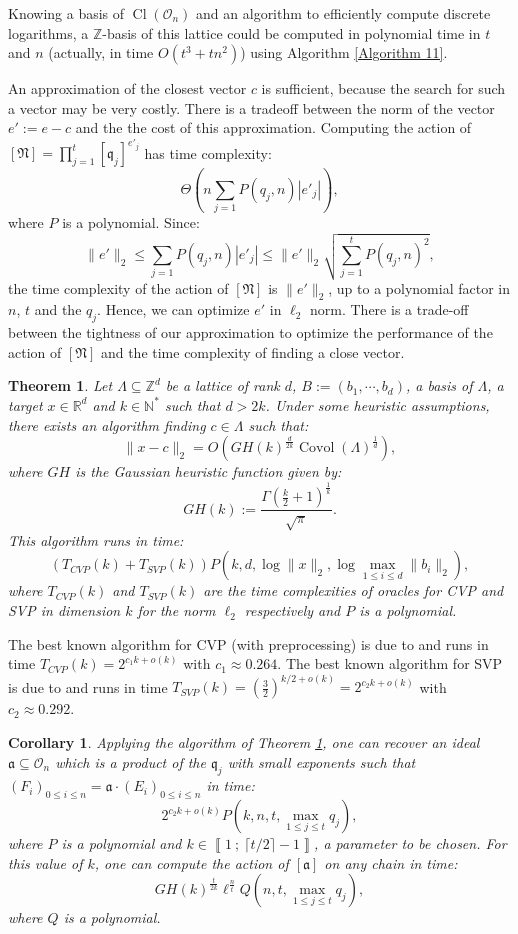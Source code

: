 \documentclass[a4paper,10pt,notitlepage]{report}
\theoremstyle{definition}
\theoremstyle{plain}
\newtheorem{Corollary}[Definition]{Corollary}
\newtheorem{Theorem}[Definition]{Theorem}
\theoremstyle{definition}
\newcommand{\N}{\mathbb{N}}
\newcommand{\Z}{\mathbb{Z}}
\newcommand{\R}{\mathbb{R}}
\newcommand{\mO}{\mathcal{O}}
\renewcommand{\i}[2]{\left\llbracket #1~;~#2\right\rrbracket}
\renewcommand{\(}{\left(}
\renewcommand{\)}{\right)}
\newcommand{\mf}[1]{\mathfrak{#1}}
\DeclareMathOperator{\Cl}{Cl}
\DeclareMathOperator{\Covol}{Covol}
\begin{document}
Knowing a basis of $\Cl(\mO_n)$ and an algorithm to efficiently compute discrete logarithms, a $\Z$-basis of this lattice could be computed in polynomial time in $t$ and $n$ (actually, in time $O(t^3+tn^2)$) using Algorithm \ref{Algorithm 11}.

An approximation of the closest vector $c$ is sufficient, because the search for such a vector may be very costly. There is a tradeoff between the norm of the vector $e':=e-c$ and the the cost of this approximation. Computing the action of $[\mf{N}]=\prod_{j=1}^t[\mf{q}_j]^{e'_j}$ has time complexity:
\[\Theta\(n\sum_{j=1}P(q_j,n)|e'_j|\),\]
where $P$ is a polynomial. Since:
\[\|e'\|_2\leq \sum_{j=1}P(q_j,n)|e'_j|\leq \|e'\|_2\sqrt{\sum_{j=1}^tP(q_j,n)^2},\]
the time complexity of the action of $[\mf{N}]$ is $\|e'\|_2$, up to a polynomial factor in $n$, $t$ and the $q_j$. Hence, we can optimize $e'$ in $\ell_2$ norm. There is a trade-off between the tightness of our approximation to optimize the performance of  the action of $[\mf{N}]$ and the time complexity of finding a close vector.

\begin{Theorem}\cite[Theorem 3.3]{Espitau2020}\label{Theorem 7}
Let $\Lambda\subseteq\Z^d$ be a lattice of rank $d$, $B:=(b_1,\cdots, b_d)$,  a basis of $\Lambda$, a target $x\in\R^d$ and $k\in\N^*$ such that $d>2k$. Under some heuristic assumptions, there exists an algorithm finding $c\in\Lambda$ such that:
\[\|x-c\|_2=O\(GH(k)^{\frac{d}{2k}}\Covol(\Lambda)^{\frac{1}{d}}\),\]
where $GH$ is the Gaussian heuristic function given by:
\[GH(k):=\frac{\Gamma\(\frac{k}{2}+1\)^{\frac{1}{k}}}{\sqrt{\pi}}.\]
This algorithm runs in time:
\[(T_{CVP}(k)+T_{SVP}(k))P\(k,d,\log\|x\|_2,\log\max_{1\leq i\leq d}\|b_i\|_2\),\]
where $T_{CVP}(k)$ and $T_{SVP}(k)$ are the time complexities of oracles  for CVP and SVP in dimension $k$ for the norm $\ell_2$ respectively and $P$ is a polynomial.
\end{Theorem}

The best known algorithm for CVP (with preprocessing) is due to \cite{Ducas2020} and runs in time $T_{CVP}(k)=2^{c_1 k+o(k)}$ with $c_1\approx 0.264$. The best known algorithm for SVP is due to \cite{Ducas2016} and runs in time $T_{SVP}(k)=\(\frac{3}{2}\)^{k/2+o(k)}=2^{c_2 k+o(k)}$ with $c_2\approx 0.292$.

\begin{Corollary}\label{Corollary 1}
Applying the algorithm of Theorem \ref{Theorem 7}, one can recover an ideal $\mf{a}\subseteq \mO_n$ which is a product of the $\mf{q}_j$ with small exponents such that $(F_i)_{0\leq i\leq n}=\mf{a}\cdot (E_i)_{0\leq i\leq n}$ in time: 
\[2^{c_2k+o(k)}P(k,n,t,\max_{1\leq j\leq t}q_j),\]
where $P$ is a polynomial and $k\in\i{1}{\lceil t/2\rceil-1}$, a parameter to be chosen.  For this value of $k$, one can compute the action of $[\mf{a}]$ on any chain in time: 
\[GH(k)^{\frac{t}{2k}}\ell^{\frac{n}{t}}Q(n,t,\max_{1\leq j\leq t}q_j),\] 
where $Q$ is a polynomial.
\end{Corollary} 
\end{document}
